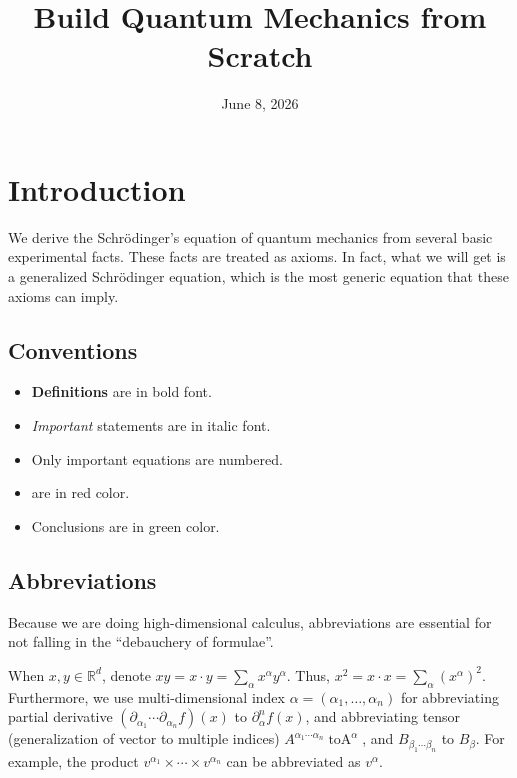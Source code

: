 \documentclass{book}
\newcommand{\tmcolor}[2]{{\color{#1}{#2}}}
\newcommand{\tmem}[1]{{\em #1\/}}
\newcommand{\tmop}[1]{\ensuremath{\operatorname{#1}}}
\newcommand{\tmstrong}[1]{\textbf{#1}}
\begin{document}
\title{Build Quantum Mechanics from Scratch}

\date{June 8, 2026}

\maketitle

\section{Introduction}

We derive the Schrödinger's equation of quantum mechanics from several basic
experimental facts. These facts are treated as axioms. In fact, what we will
get is a generalized Schrödinger equation, which is the most generic equation
that these axioms can imply.

\subsection{Conventions}

\begin{itemize}
  \item {\tmstrong{Definitions}} are in bold font.
  
  \item {\tmem{Important}} statements are in italic font.
  
  \item Only important equations are numbered.
  
  \item \tmcolor{red}{Questions} are in red color.
  
  \item {\color[HTML]{008000}Conclusions} are in green color.
\end{itemize}

\subsection{Abbreviations}

Because we are doing high-dimensional calculus, abbreviations are essential
for not falling in the ``debauchery of formulae''.

When $x, y \in \mathbb{R}^d$, denote $xy = x \cdot y = \sum_{\alpha}
x^{\alpha} y^{\alpha}$. Thus, $x^2 = x \cdot x = \sum_{\alpha}
(x^{\alpha})^2$. Furthermore, we use multi-dimensional index $\alpha =
(\alpha_1, \ldots, \alpha_n)$ for abbreviating partial derivative
$(\partial_{\alpha_1} \cdots \partial_{\alpha_n} f) (x)$ to
$\partial_{\alpha}^n f (x)$, and abbreviating tensor (generalization of vector
to multiple indices) $A^{\alpha_1 \cdots \alpha_n} \tmop{toA}^{\alpha}$, and
$B_{\beta_1 \cdots \beta_n}$ to $B_{\beta}$. For example, the product
$v^{\alpha_1} \times \cdots \times v^{\alpha_n}$ can be abbreviated as
$v^{\alpha}$.
\end{document}
